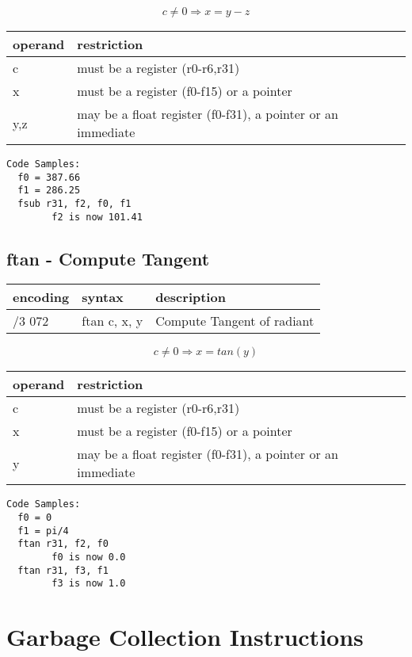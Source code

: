 \documentclass[letterpaper,10pt,openright,twoside,onecolumn]{book}
\begin{document}
  \begin{displaymath} c \neq 0 \Rightarrow x = y - z\end{displaymath}

  \flushleft
  \begin{tabular}{|l|l|}
   \hline
    operand & restriction \\
   \hline
    c & must be a register (r0-r6,r31) \\
    x & must be a register (f0-f15) or a pointer \\
    y,z & may be a float register (f0-f31), a pointer or an immediate \\
   \hline
  \end{tabular}

  \begin{verbatim}
Code Samples:
  f0 = 387.66
  f1 = 286.25
  fsub r31, f2, f0, f1
        f2 is now 101.41
  \end{verbatim}
\newpage\subsection{ftan - Compute Tangent}
  \begin{tabular}{|l|l|l|}
   \hline
    encoding & syntax & description \\
   \hline
    /3 072 & ftan c, x, y & Compute Tangent of radiant\\
   \hline
  \end{tabular}

  \begin{displaymath} c \neq 0 \Rightarrow x = tan(y)\end{displaymath}

  \flushleft
  \begin{tabular}{|l|l|}
   \hline
    operand & restriction \\
   \hline
    c & must be a register (r0-r6,r31) \\
    x & must be a register (f0-f15) or a pointer \\
    y & may be a float register (f0-f31), a pointer or an immediate \\
   \hline
  \end{tabular}

  \begin{verbatim}
Code Samples:
  f0 = 0
  f1 = pi/4
  ftan r31, f2, f0
        f0 is now 0.0
  ftan r31, f3, f1
        f3 is now 1.0
  \end{verbatim}
\clearpage\section{Garbage Collection Instructions}
\end{document}
